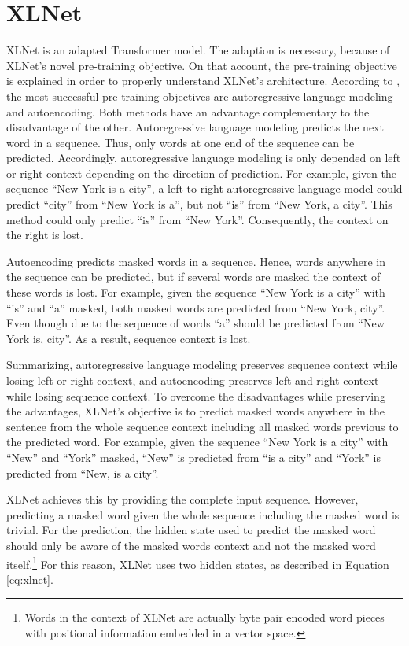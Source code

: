 \section{XLNet}
XLNet is an adapted Transformer model. The adaption is necessary, because of XLNet's novel pre-training objective. On that account, the pre-training objective is explained in order to properly understand XLNet's architecture. According to \cite{Yang.2019}, the most successful pre-training objectives are autoregressive language modeling and autoencoding. Both methods have an advantage complementary to the disadvantage of the other. Autoregressive language modeling predicts the next word in a sequence. Thus, only words at one end of the sequence can be predicted. Accordingly, autoregressive language modeling is only depended on left or right context depending on the direction of prediction. For example, given the sequence \enquote{New York is a city}, a left to right autoregressive language model could predict \enquote{city} from \enquote{New York is a}, but not \enquote{is} from \enquote{New York, a city}. This method could only predict \enquote{is} from \enquote{New York}. Consequently, the context on the right is lost.\autocite{Yang.2019}
\par
Autoencoding predicts masked words in a sequence. Hence, words anywhere in the sequence can be predicted, but if several words are masked the context of these words is lost. For example, given the sequence \enquote{New York is a city} with \enquote{is} and \enquote{a} masked, both masked words are predicted from \enquote{New York, city}. Even though due to the sequence of words \enquote{a} should be predicted from \enquote{New York is, city}. As a result, sequence context is lost.\autocite{Yang.2019}
\par
Summarizing, autoregressive language modeling preserves sequence context while losing left or right context, and autoencoding preserves left and right context while losing sequence context. To overcome the disadvantages while preserving the advantages, XLNet's objective is to predict masked words anywhere in the sentence from the whole sequence context including all masked words previous to the predicted word. For example, given the sequence \enquote{New York is a city} with \enquote{New} and \enquote{York} masked, \enquote{New} is predicted from \enquote{is a city} and \enquote{York} is predicted from \enquote{New, is a city}.\autocite{Yang.2019}
\par
XLNet achieves this by providing the complete input sequence. However, predicting a masked word given the whole sequence including the masked word is trivial. For the prediction, the hidden state used to predict the masked word should only be aware of the masked words context and not the masked word itself.\footnote{Words in the context of XLNet are actually byte pair encoded word pieces with positional information embedded in a vector space.} For this reason, XLNet uses two hidden states, as described in Equation \eqref{eq:xlnet}.\autocite{Yang.2019}
